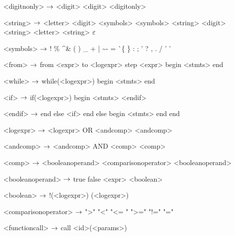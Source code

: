 \begin{grammar}
<digitnonly> $\rightarrow$ <digit>
	\alt <digit> <digitonly>

<string> $\rightarrow$ <letter>
\alt <digit>
\alt <symbols>
\alt <symbols> <string>
\alt <digit> <string>
\alt <letter> <string>
\alt $\varepsilon$

<symbols> $\rightarrow$ !
\alt \%
\alt \^
\alt \&
\alt *
\alt (
\alt )
\alt \_
\alt +
\alt |
\alt \~
\alt -
\alt =
\alt \`
\alt \{
\alt \}
\alt [
\alt ]
\alt :
\alt ;
\alt '
\alt ?
\alt ,
\alt .
\alt /
\alt ' '

<from> $\rightarrow$ from <expr> to <logexpr> step <expr>
	begin
		<stmts>
	end 

<while> $\rightarrow$ while(<logexpr>)
		begin
			<stmts>
		end

<if> $\rightarrow$ if(<logexpr>)
	begin
		<stmts>
	<endif>

<endif> $\rightarrow$ end
	else <if>
	\alt end
	else
	begin
		<stmts>
	end
	\alt end

<logexpr> $\rightarrow$ <logexpr> OR <andcomp>
		\alt <andcomp>

<andcomp> $\rightarrow$ <andcomp> AND <comp>

<comp> $\rightarrow$ <booleanoperand> <comparisonoperator> <booleanoperand>

<booleanoperand> $\rightarrow$ true
		\alt false
		\alt <boolean>

<boolean> $\rightarrow$ !(<logexpr>)
		\alt (<logexpr>)

<comparisonoperator> $\rightarrow$ ">"
				\alt "<"
				\alt "<= "
				\alt ">="
				\alt "!="
				\alt "="

<functioncall> $\rightarrow$ call <id>(<params>)

\end{grammar}
